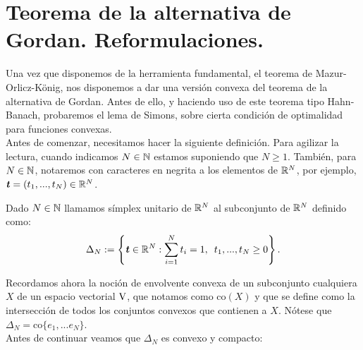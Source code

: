 \section{Teorema de la alternativa de Gordan. Reformulaciones.}
\newcommand{\ttt}{\textbf{\emph{t}}}
\newcommand{\sss}{\textbf{\emph{s}}}
\newcommand{\xx}{\textbf{\emph{x}}}
\newcommand{\yy}{\textbf{\emph{y}}}
\newcommand{\vv}{\textbf{\emph{v}}}
\newcommand{\ww}{\textbf{\emph{w}}}
\newcommand{\zz}{\textbf{\emph{z}}}
\newcommand{\ccc}{\textbf{\emph{c}}}

Una vez que disponemos de la herramienta fundamental, el teorema de Mazur-Orlicz-König, nos disponemos a dar una versión convexa del teorema de la alternativa de Gordan. Antes de ello, y haciendo uso de este teorema tipo Hahn-Banach, probaremos el lema de Simons, sobre cierta condición de optimalidad para funciones convexas. \\

Antes de comenzar, necesitamos hacer la siguiente definición. Para agilizar la lectura, cuando indicamos $ N\in \mathbb{N} $ estamos suponiendo que $ N \geq 1 $. También, para $ N \in \mathbb{N} $, notaremos con caracteres en negrita a los elementos de $ \mathbb{R}^N $, por ejemplo, $  \ttt = (t_1,...,t_N)\in \RR^N$. 

\begin{definicion}
	Dado $ N \in \mathbb{N} $ llamamos símplex unitario de $ \mathbb{R}^N $ al subconjunto de $ \mathbb{R}^N $ definido como:
	\begin{equation*}
	\Delta_N := \left\lbrace \ttt \in \RR^N: \sum_{i=1}^{N}{t_i} = 1, \hspace{0.5em} t_1,...,t_N \geq 0 \right\rbrace .
	\end{equation*}
\end{definicion}

Recordamos ahora la noción de envolvente convexa de un subconjunto cualquiera $ X $ de un espacio vectorial $ \vecSpace $, que notamos como $ \mathrm{co}(X) $ y que se define como la intersección de todos los conjuntos convexos que contienen a $ X $. Nótese que $ \Delta_N = \mathrm{co}\{e_1,...e_N\} $. \\

Antes de continuar veamos que $ \Delta_N $ es convexo y compacto:

